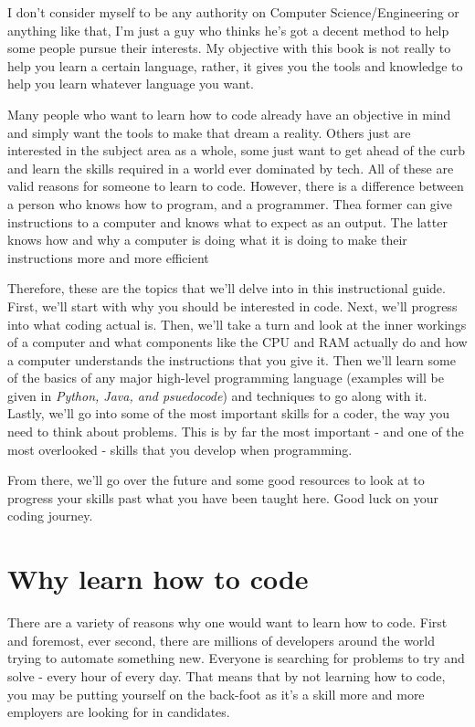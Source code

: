 \documentclass[12pt,a4paper]{book}
\begin{document}
		I don't consider myself to be any authority on Computer Science/Engineering or anything like that, I'm just a guy who thinks he's got a decent method to help some people pursue their interests. My objective with this book is not really to help you learn a certain language, rather, it gives you the tools and knowledge to help you learn whatever language you want.
		
		Many people who want to learn how to code already have an objective in mind and simply want the tools to make that dream a reality. Others just are interested in the subject area as a whole, some just want to get ahead of the curb and learn the skills required in a world ever dominated by tech. All of these are valid reasons for someone to learn to code. However, there is a difference between a person who knows how to program, and a programmer. Thea former can give instructions to a computer and knows what to expect as an output. The latter knows how and why a computer is doing what it is doing to make their instructions more and more efficient
		
		Therefore, these are the topics that we'll delve into in this instructional guide. First, we'll start with why you should be interested in code. Next, we'll progress into what coding actual is. Then, we'll take a turn and look at the inner workings of a computer and what components like the CPU and RAM actually do and how a computer understands the instructions that you give it. Then we'll learn some of the basics of any major high-level programming language (examples will be given in \textit{Python, Java, and psuedocode}) and techniques to go along with it. Lastly, we'll go into some of the most important skills for a coder, the way you need to think about problems. This is by far the most important - and one of the most overlooked - skills that you develop when programming.
		
		From there, we'll go over the future and some good resources to look at to progress your skills past what you have been taught here. Good luck on your coding journey.

	\chapter{Why learn how to code}  \label{chap:why-code}
		There are a variety of reasons why one would want to learn how to code. First and foremost, ever second, there are millions of developers around the world trying to automate something new. Everyone is searching for problems to try and solve - every hour of every day. That means that by not learning how to code, you may be putting yourself on the back-foot as it's a skill more and more employers are looking for in candidates.
\end{document}

